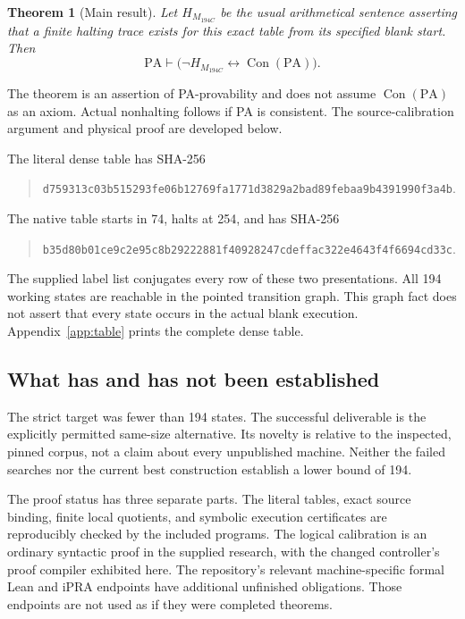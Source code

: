 \documentclass[11pt,letterpaper]{article}
\newcommand{\PA}{\mathrm{PA}}
\newcommand{\Con}{\operatorname{Con}}
\newcommand{\MC}{M_{194C}}
\newtheorem{theorem}{Theorem}[section]
\begin{document}
\begin{theorem}[Main result]
Let $H_{\MC}$ be the usual arithmetical sentence asserting that a finite
halting trace exists for this exact table from its specified blank start.
Then
\[
 \boxed{\PA\vdash\bigl(\neg H_{\MC}\leftrightarrow\Con(\PA)\bigr).}
\]
\end{theorem}

The theorem is an assertion of PA-provability and does not assume
$\Con(\PA)$ as an axiom. Actual nonhalting follows if PA is consistent.
The source-calibration argument and physical proof are developed below.

The literal dense table has SHA-256
\begin{quote}\small
\nolinkurl{d759313c03b515293fe06b12769fa1771d3829a2bad89febaa9b4391990f3a4b}.
\end{quote}
The native table starts in 74, halts at 254, and has SHA-256
\begin{quote}\small
\nolinkurl{b35d80b01ce9c2e95c8b29222881f40928247cdeffac322e4643f4f6694cd33c}.
\end{quote}
The supplied label list conjugates every row of these two presentations.
All 194 working states are reachable in the pointed transition graph.
This graph fact does not assert that every state occurs in the actual
blank execution. Appendix~\ref{app:table} prints the complete dense table.

\subsection{What has and has not been established}

The strict target was fewer than 194 states. The successful deliverable is
the explicitly permitted same-size alternative. Its novelty is relative
to the inspected, pinned corpus, not a claim about every unpublished
machine. Neither the failed searches nor the current best construction
establish a lower bound of 194.

The proof status has three separate parts. The literal tables, exact source
binding, finite local quotients, and symbolic execution certificates are
reproducibly checked by the included programs. The logical calibration is
an ordinary syntactic proof in the supplied research, with the changed
controller's proof compiler exhibited here. The repository's relevant
machine-specific formal Lean and iPRA endpoints have additional unfinished
obligations. Those endpoints
are not used as if they were completed theorems.
\end{document}
